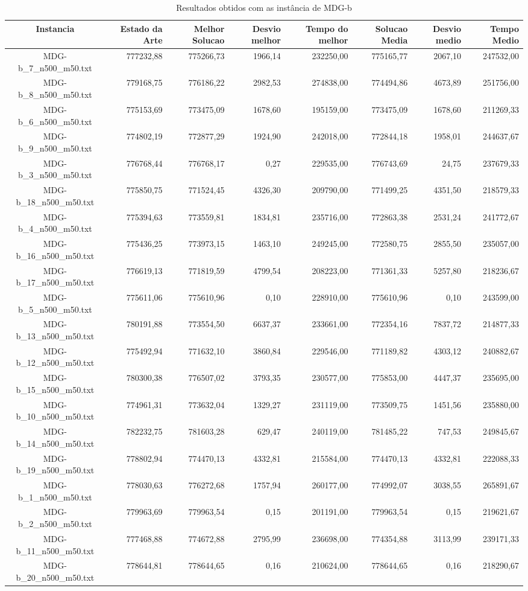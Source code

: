\begin{landscape}
	\begin{table}[t]
	\centering
	\begin{tabular}{| c | r | r | r | r | r | r | r |  }
\hline
Instancia&Estado da Arte&Melhor Solucao&Desvio melhor&Tempo do melhor&Solucao Media&Desvio medio&Tempo Medio\\ \hline 
		MDG-b\_7\_n500\_m50.txt&777232,88&775266,73&1966,14&232250,00&775165,77&2067,10&247532,00\\
		MDG-b\_8\_n500\_m50.txt&779168,75&776186,22&2982,53&274838,00&774494,86&4673,89&251756,00\\
		MDG-b\_6\_n500\_m50.txt&775153,69&773475,09&1678,60&195159,00&773475,09&1678,60&211269,33\\
		MDG-b\_9\_n500\_m50.txt&774802,19&772877,29&1924,90&242018,00&772844,18&1958,01&244637,67\\
		MDG-b\_3\_n500\_m50.txt&776768,44&776768,17&0,27&229535,00&776743,69&24,75&237679,33\\
		MDG-b\_18\_n500\_m50.txt&775850,75&771524,45&4326,30&209790,00&771499,25&4351,50&218579,33\\
		MDG-b\_4\_n500\_m50.txt&775394,63&773559,81&1834,81&235716,00&772863,38&2531,24&241772,67\\
		MDG-b\_16\_n500\_m50.txt&775436,25&773973,15&1463,10&249245,00&772580,75&2855,50&235057,00\\
		MDG-b\_17\_n500\_m50.txt&776619,13&771819,59&4799,54&208223,00&771361,33&5257,80&218236,67\\
		MDG-b\_5\_n500\_m50.txt&775611,06&775610,96&0,10&228910,00&775610,96&0,10&243599,00\\
		MDG-b\_13\_n500\_m50.txt&780191,88&773554,50&6637,37&233661,00&772354,16&7837,72&214877,33\\
		MDG-b\_12\_n500\_m50.txt&775492,94&771632,10&3860,84&229546,00&771189,82&4303,12&240882,67\\
		MDG-b\_15\_n500\_m50.txt&780300,38&776507,02&3793,35&230577,00&775853,00&4447,37&235695,00\\
		MDG-b\_10\_n500\_m50.txt&774961,31&773632,04&1329,27&231119,00&773509,75&1451,56&235880,00\\
		MDG-b\_14\_n500\_m50.txt&782232,75&781603,28&629,47&240119,00&781485,22&747,53&249845,67\\
		MDG-b\_19\_n500\_m50.txt&778802,94&774470,13&4332,81&215584,00&774470,13&4332,81&222088,33\\
		MDG-b\_1\_n500\_m50.txt&778030,63&776272,68&1757,94&260177,00&774992,07&3038,55&265891,67\\
		MDG-b\_2\_n500\_m50.txt&779963,69&779963,54&0,15&201191,00&779963,54&0,15&219621,67\\
		MDG-b\_11\_n500\_m50.txt&777468,88&774672,88&2795,99&236698,00&774354,88&3113,99&239171,33\\
		MDG-b\_20\_n500\_m50.txt&778644,81&778644,65&0,16&210624,00&778644,65&0,16&218290,67\\
\hline
	\end{tabular}
	\caption{Resultados obtidos com as instância de MDG-b}
	\label{tabela_mdg_b}
	\end{table}
\end{landscape}
